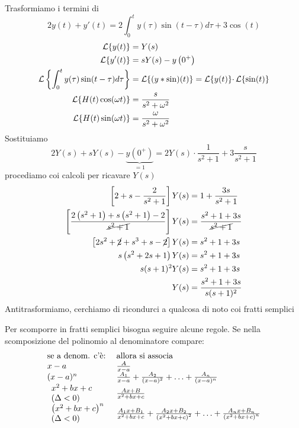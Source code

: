 Trasformiamo i termini di
\begin{equation*}
2y( t) +y'( t) =2\int ^{t}_{0} y( \tau )\sin( t-\tau ) d\tau +3\cos( t)
\end{equation*}
\begin{align*}
\mathcal{L}\{y( t)\} & =Y( s)\\
\mathcal{L}\{y'( t)\} & =sY( s) -y\left( 0^{+}\right)\\
\mathcal{L}\left\{\int ^{t}_{0} y( \tau )\sin( t-\tau ) d\tau \right\} & =\mathcal{L}\{( y*\sin)( t)\} =\mathcal{L}\{y( t)\} \cdotp \mathcal{L}\{\sin( t)\}\\
\mathcal{L}\{H( t)\cos( \omega t)\} & =\frac{s}{s^{2} +\omega ^{2}}\\
\mathcal{L}\{H( t)\sin( \omega t)\} & =\frac{\omega }{s^{2} +\omega ^{2}}
\end{align*}
Sostituiamo
\begin{equation*}
2Y( s) +sY( s) -\underbrace{y\left( 0^{+}\right)}_{=1} =2Y( s) \cdotp \frac{1}{s^{2} +1} +3\frac{s}{s^{2} +1}
\end{equation*}
procediamo coi calcoli per ricavare $Y( s)$
\begin{align*}
\left[ 2+s-\frac{2}{s^{2} +1}\right] Y( s) & =1+\frac{3s}{s^{2} +1}\\
\left[\frac{2\left( s^{2} +1\right) +s\left( s^{2} +1\right) -2}{\cancel{s^{2} +1}}\right] Y( s) & =\frac{s^{2} +1+3s}{\cancel{s^{2} +1}}\\
\left[ 2s^{2} +\cancel{2} +s^{3} +s-\cancel{2}\right] Y( s) & =s^{2} +1+3s\\
s\left( s^{2} +2s+1\right) Y( s) & =s^{2} +1+3s\\
s( s+1)^{2} Y( s) & =s^{2} +1+3s\\
Y( s) & =\frac{s^{2} +1+3s}{s( s+1)^{2}}
\end{align*}
Antitrasformiamo, cerchiamo di ricondurci a qualcosa di noto coi fratti semplici
\begin{rem}
Per scomporre in fratti semplici bisogna seguire alcune regole. Se nella scomposizione del polinomio al denominatore compare:
\begin{equation*}
\begin{array}{ l l }
\text{se a denom. c'è:} & \text{allora si associa}\\
x-a & \frac{A}{x-a}\\
(x-a)^{n} & \frac{A_{1}}{x-a} +\frac{A_{2}}{(x-a)^{2}} +\dotsc +\frac{A_{n}}{(x-a)^{n}}\\
 \begin{array}{l}
x^{2} +bx+c\\
( \Delta < 0)
\end{array} & \frac{Ax+B}{x^{2} +bx+c}\\
 \begin{array}{l}
\left( x^{2} +bx+c\right)^{n}\\
( \Delta < 0)
\end{array} & \frac{A_{1} x+B_{1}}{x^{2} +bx+c} +\frac{A_{2} x+B_{2}}{\left( x^{2} +bx+c\right)^{2}} +\dotsc +\frac{A_{n} x+B_{n}}{\left( x^{2} +bx+c\right)^{n}}
\end{array}
\end{equation*}
\end{rem}
